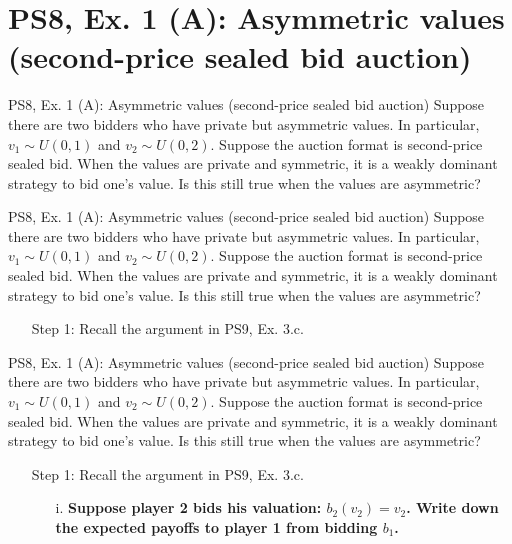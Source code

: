 \section{PS8, Ex. 1 (A): Asymmetric values (second-price sealed bid auction)}

\begin{frame}{PS8, Ex. 1 (A): Asymmetric values (second-price sealed bid auction)}
    Suppose there are two bidders who have private but asymmetric values. In particular, $v_1\sim U(0, 1)$ and $v_2\sim U(0, 2)$. Suppose the auction format is second-price sealed bid. When the values are private and symmetric, it is a weakly dominant strategy to bid one’s value. Is this still true when the values are asymmetric?
    \vfill\null
\end{frame}

\begin{frame}{PS8, Ex. 1 (A): Asymmetric values (second-price sealed bid auction)}
    Suppose there are two bidders who have private but asymmetric values. In particular, $v_1\sim U(0, 1)$ and $v_2\sim U(0, 2)$. Suppose the auction format is second-price sealed bid. When the values are private and symmetric, it is a weakly dominant strategy to bid one’s value. Is this still true when the values are asymmetric?
    \begin{multicols}{2}
      \begin{itemize}
        \item[Step 1:] Recall the argument in PS9, Ex. 3.c.
      \end{itemize}
      \vfill\null\columnbreak
      \vfill\null
    \end{multicols}
\end{frame}
\begin{frame}{PS8, Ex. 1 (A): Asymmetric values (second-price sealed bid auction)}
    Suppose there are two bidders who have private but asymmetric values. In particular, $v_1\sim U(0, 1)$ and $v_2\sim U(0, 2)$. Suppose the auction format is second-price sealed bid. When the values are private and symmetric, it is a weakly dominant strategy to bid one’s value. Is this still true when the values are asymmetric?
    \begin{multicols}{2}
      \begin{itemize}
        \item[Step 1:] Recall the argument in PS9, Ex. 3.c.
        \begin{itemize}\normalsize
          \item[i.]   \textbf{Suppose player 2 bids his valuation: $b_2(v_2) = v_2$. Write down the expected payoffs to player 1 from bidding $b_1$.}
        \end{itemize}
      \end{itemize}
      \vfill\null\columnbreak
      \vfill\null
    \end{multicols}
\end{frame}
